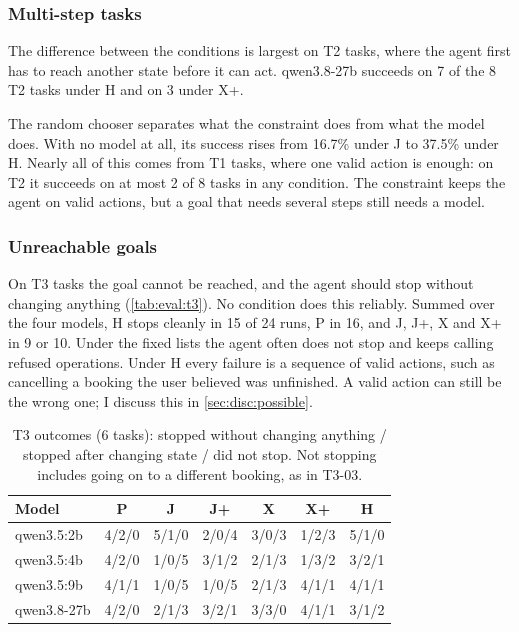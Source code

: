 \FloatBarrier

\subsubsection{Multi-step tasks}\label{sec:results:multistep}

The difference between the conditions is largest on T2 tasks, where the agent first has to reach another state before it can act. qwen3.8-27b succeeds on 7 of the 8 T2 tasks under H and on 3 under X+.

The random chooser separates what the constraint does from what the model does.
With no model at all, its success rises from 16.7\% under J to 37.5\% under H. Nearly all of this comes from T1 tasks, where one valid action is enough: on T2 it succeeds on at most 2 of 8 tasks in any condition.
The constraint keeps the agent on valid actions, but a goal that needs several steps still needs a model.

\subsubsection{Unreachable goals}\label{sec:results:unreachable}

On T3 tasks the goal cannot be reached, and the agent should stop without changing anything (\autoref{tab:eval:t3}).
No condition does this reliably.
Summed over the four models, H stops cleanly in 15 of 24 runs, P in 16, and J, J+, X and X+ in 9 or 10.
Under the fixed lists the agent often does not stop and keeps calling refused operations.
Under H every failure is a sequence of valid actions, such as cancelling a booking the user believed was unfinished.
A valid action can still be the wrong one; I discuss this in \autoref{sec:disc:possible}.

\begin{table}[htbp]
\centering
\caption{T3 outcomes (6 tasks): stopped without changing anything / stopped after changing state / did not stop. Not stopping includes going on to a different booking, as in T3-03.}
\label{tab:eval:t3}
\begin{tabular}{lcccccc}
\hline
Model & P & J & J+ & X & X+ & H \\
\hline
qwen3.5:2b & 4/2/0 & 5/1/0 & 2/0/4 & 3/0/3 & 1/2/3 & 5/1/0 \\
qwen3.5:4b & 4/2/0 & 1/0/5 & 3/1/2 & 2/1/3 & 1/3/2 & 3/2/1 \\
qwen3.5:9b & 4/1/1 & 1/0/5 & 1/0/5 & 2/1/3 & 4/1/1 & 4/1/1 \\
qwen3.8-27b & 4/2/0 & 2/1/3 & 3/2/1 & 3/3/0 & 4/1/1 & 3/1/2 \\
\hline
\end{tabular}
\end{table}

